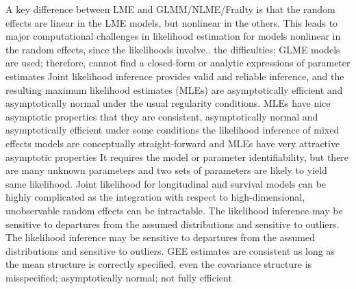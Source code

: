 A key difference between LME and GLMM/NLME/Frailty is that the random effects are linear in the LME models, but nonlinear in the others. This leads to major computational challenges in likelihood estimation for models nonlinear in the random effects, since the likelihoods involve..
the difficulties: GLME models are used; therefore, cannot find a closed-form or analytic expressions of parameter estimates
%
Joint likelihood inference provides valid and reliable inference, and the resulting maximum likelihood estimates (MLEs) are asymptotically efficient and asymptotically normal under the usual regularity conditions. 
MLEs have nice asymptotic properties that they are consistent, asymptotically normal and asymptotically efficient under some conditions
the likelihood inference of mixed effects models are conceptually straight-forward and MLEs have very attractive asymptotic properties
%
It requires the model or parameter identifiability, but there are many unknown parameters and two sets of parameters are likely to yield same likelihood. 
Joint likelihood for longitudinal and survival models can be highly complicated as the integration with respect to high-dimensional, unobservable random effects can be intractable. %
%
The likelihood inference may be sensitive to departures from the assumed distributions and sensitive to outliers.
%
The likelihood inference may be sensitive to departures from the assumed distributions and sensitive to outliers.
GEE estimates are consistent as long as the mean structure is correctly specified, even the covariance structure is misspecified; asymptotically normal; not fully efficient


